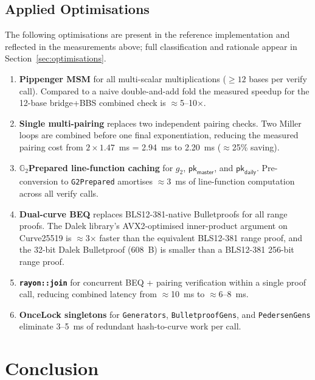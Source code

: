 \documentclass[11pt]{article}
\theoremstyle{definitionstyle}
\theoremstyle{plain}
\begin{document}
\subsection{Applied Optimisations}

The following optimisations are present in the reference implementation
and reflected in the measurements above; full classification and
rationale appear in Section~\ref{sec:optimisations}.

\begin{enumerate}[leftmargin=*]
\item \textbf{Pippenger MSM} for all multi-scalar multiplications
  ($\geq 12$ bases per verify call).  Compared to a naive double-and-add
  fold the measured speedup for the 12-base bridge+BBS combined check is
  $\approx$5--10$\times$.

\item \textbf{Single multi-pairing} replaces two independent pairing
  checks.  Two Miller loops are combined before one final exponentiation,
  reducing the measured pairing cost from $2\times 1.47$~ms = 2.94~ms
  to 2.20~ms ($\approx$25\% saving).

\item \textbf{$\mathbb{G}_2$Prepared line-function caching} for $g_2$,
  $\mathsf{pk}_{\mathsf{master}}$, and $\mathsf{pk}_{\mathsf{daily}}$.
  Pre-conversion to \texttt{G2Prepared} amortises $\approx$3~ms of
  line-function computation across all verify calls.

\item \textbf{Dual-curve BEQ} replaces BLS12-381-native Bulletproofs for
  all range proofs.  The Dalek library's AVX2-optimised inner-product
  argument on Curve25519 is $\approx$3$\times$ faster than the equivalent
  BLS12-381 range proof, and the 32-bit Dalek Bulletproof (608~B) is
  smaller than a BLS12-381 256-bit range proof.

\item \textbf{\texttt{rayon::join}} for concurrent BEQ + pairing
  verification within a single proof call, reducing combined latency
  from $\approx$10~ms to $\approx$6--8~ms.

\item \textbf{OnceLock singletons} for \texttt{Generators},
  \texttt{BulletproofGens}, and \texttt{PedersenGens} eliminate
  3--5~ms of redundant hash-to-curve work per call.
\end{enumerate}

\section{Conclusion}
\end{document}
